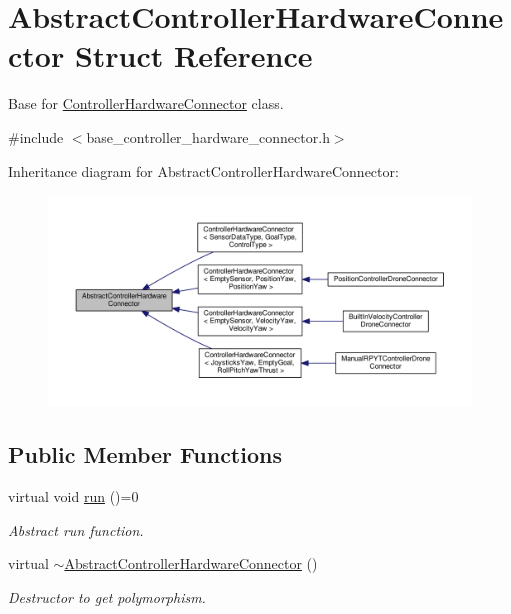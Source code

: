 \hypertarget{structAbstractControllerHardwareConnector}{\section{Abstract\-Controller\-Hardware\-Connector Struct Reference}
\label{structAbstractControllerHardwareConnector}
}


Base for \hyperlink{classControllerHardwareConnector}{Controller\-Hardware\-Connector} class.  




{\ttfamily \#include $<$base\-\_\-controller\-\_\-hardware\-\_\-connector.\-h$>$}



Inheritance diagram for Abstract\-Controller\-Hardware\-Connector\-:\nopagebreak
\begin{figure}[H]
\begin{center}
\leavevmode
\includegraphics[width=350pt]{structAbstractControllerHardwareConnector__inherit__graph}
\end{center}
\end{figure}
\subsection*{Public Member Functions}
\begin{DoxyCompactItemize}
\item 
virtual void \hyperlink{structAbstractControllerHardwareConnector_a0fcf605e19daef2f9f99d4dc2a23feb4}{run} ()=0
\begin{DoxyCompactList}\small\item\em Abstract run function. \end{DoxyCompactList}\item 
virtual \hyperlink{structAbstractControllerHardwareConnector_a06f931d74faac604c3ef56cb5ba75399}{$\sim$\-Abstract\-Controller\-Hardware\-Connector} ()
\begin{DoxyCompactList}\small\item\em Destructor to get polymorphism. \end{DoxyCompactList}\end{DoxyCompactItemize}


